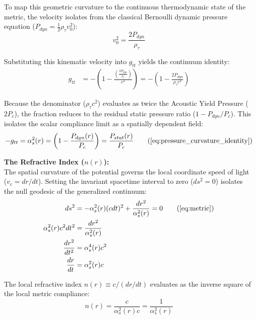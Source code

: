 To map this geometric curvature to the continuous thermodynamic state of the metric, the velocity isolates from the classical Bernoulli dynamic pressure equation ($P_{dyn} = \frac{1}{2}\rho_{\tau} v_0^2$):
\begin{equation}
    v_0^2 = \frac{2 P_{dyn}}{\rho_{\tau}}
\end{equation}

Substituting this kinematic velocity into $g_{tt}$ yields the continuum identity:
\begin{align}
    g_{tt} &= -\left( 1 - \frac{\left( \frac{2 P_{dyn}}{\rho_{\tau}} \right)}{c^2} \right) = -\left( 1 - \frac{2 P_{dyn}}{\rho_{\tau} c^2} \right)
\end{align}

Because the denominator ($\rho_{\tau} c^2$) evaluates as twice the Acoustic Yield Pressure ($2P_c$), the fraction reduces to the residual static pressure ratio ($1 - P_{dyn}/P_c$). This isolates the scalar compliance limit as a spatially dependent field:
\begin{equation}
    -g_{tt} = \alpha_s^2(r) = \left( 1 - \frac{P_{dyn}(r)}{P_c} \right) = \frac{P_{stat}(r)}{P_c} \tag{\ref{eq:pressure_curvature_identity}} %
\end{equation}

\vspace{0.2cm}

\textbf{The Refractive Index ($n(r)$):} \\
The spatial curvature of the potential governs the local coordinate speed of light ($v_c = dr/dt$). Setting the invariant spacetime interval to zero ($ds^2=0$) isolates the null geodesic of the generalized continuum: 
\begin{align}
    ds^2 &= -\alpha_s^2(r) (c dt)^2 + \frac{dr^2}{\alpha_s^2(r)} = 0 \tag{\ref{eq:metric}} \\ %
    \alpha_s^2(r) c^2 dt^2 &= \frac{dr^2}{\alpha_s^2(r)} \\
    \frac{dr^2}{dt^2} &= \alpha_s^4(r) c^2 \\
    \frac{dr}{dt} &= \alpha_s^2(r) c
\end{align}

The local refractive index $n(r) \equiv c / (dr/dt)$ evaluates as the inverse square of the local metric compliance:
\begin{equation}
    n(r) = \frac{c}{\alpha_s^2(r) c} = \frac{1}{\alpha_s^2(r)} \label{eq:refractive_index} %
\end{equation}

